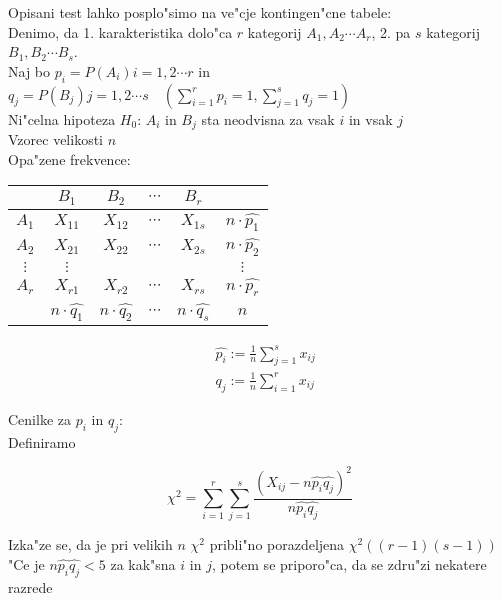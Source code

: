 \documentclass[a4paper,12pt]{article}
\theoremstyle{definition}
\theoremstyle{remark}
\begin{document}
Opisani test lahko posplo"simo na ve"cje kontingen"cne tabele: \\
Denimo, da 1. karakteristika dolo"ca $r$ kategorij $A_1, A_2 \cdots A_r$, 2. pa $s$ kategorij $B_1, B_2 \cdots B_s$. \\
Naj bo $p_i = P(A_i) i = 1, 2 \cdots r$ in $q_j = P(B_j) j = 1, 2 \cdots s \quad (\sum_{i=1}^{r} p_i = 1, \sum_{j=1}^{s} q_j = 1)$ \\
Ni"celna hipoteza $H_0$: $A_i$ in $B_j$ sta neodvisna za vsak $i$ in vsak $j$ \\
Vzorec velikosti $n$ \\
Opa"zene frekvence:

\begin{center}
    \begin{tabular}{c | c c c c | c} 
        & $B_1$ & $B_2$ & $\cdots$ & $B_r$ & \\
        \hline
        $A_1$ & $X_{11}$ & $X_{12}$ & $\cdots$ & $X_{1s}$ & $n \cdot \hat{p_1}$ \\ 
        $A_2$ & $X_{21}$ & $X_{22}$ & $\cdots$ & $X_{2s}$ & $n \cdot \hat{p_2}$ \\ 
        $\vdots$ & $\vdots$ & & & & $\vdots$ \\ 
        $A_r$ & $X_{r1}$ & $X_{r2}$ & $\cdots$ & $X_{rs}$ & $n \cdot \hat{p_r}$ \\
        \hline
        & $n \cdot \hat{q_1}$ & $n \cdot \hat{q_2}$ & $\cdots$ & $n \cdot \hat{q_s}$ & $n$
    \end{tabular}
\end{center}

\begin{align*}
    &\hat{p_i} := \frac{1}{n} \sum_{j=1}^{s} x_{ij} \\
    &\hat{q_j} := \frac{1}{n} \sum_{i=1}^{r} x_{ij}
\end{align*}

Cenilke za $p_i$ in $q_j$: \\
Definiramo

\begin{equation*}
    \chi^2 = \sum_{i=1}^{r} \sum_{j=1}^{s} \frac{(X_{ij} - n \hat{p_i} \hat{q_j})^2}{n \hat{p_i} \hat{q_j}}
\end{equation*}

Izka"ze se, da je pri velikih $n$ $\chi^2$ pribli"no porazdeljena $\chi^2((r-1)(s-1))$ \\


"Ce je $n \hat{p_i} \hat{q_j} < 5$ za kak"sna $i$ in $j$, potem se priporo"ca, da se zdru"zi nekatere razrede
\end{document}
